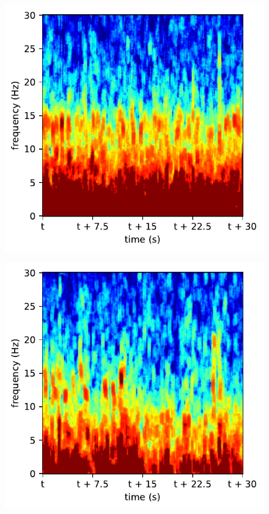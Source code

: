 \begin{subfigure}{.16\textwidth}
  \centering
  \includegraphics[width=1\linewidth]{./pics/class_clean_4}
  \caption{}
  \label{fig_1_15}
\end{subfigure}%
\begin{subfigure}{.16\textwidth}
  \centering
  \includegraphics[width=1\linewidth]{./pics/class_clean_5}
  \caption{}
  \label{fig_1_16}
\end{subfigure}



